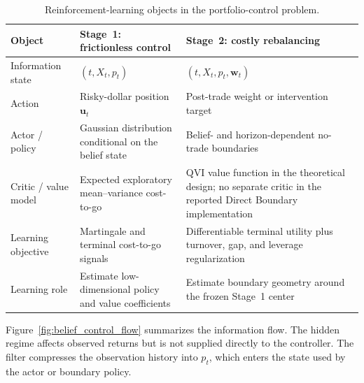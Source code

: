 \documentclass[a4paper,10pt]{article}
\newcommand{\bu}{\bm{u}}
\newcommand{\bw}{\bm{w}}
\begin{document}
\begin{table}[H]
\centering
\small
\caption{Reinforcement-learning objects in the portfolio-control problem.}
\label{tab:rl_correspondence}
\begin{tabular}{>{\raggedright\arraybackslash}p{} >{\raggedright\arraybackslash}p{} >{\raggedright\arraybackslash}p{}}
\toprule
Object & Stage~1: frictionless control & Stage~2: costly rebalancing \\
\midrule
Information state & $(t,X_t,p_t)$ & $(t,X_t,p_t,\bw_t)$ \\
Action & Risky-dollar position $\bu_t$ & Post-trade weight or intervention target \\
Actor / policy & Gaussian distribution conditional on the belief state & Belief- and horizon-dependent no-trade boundaries \\
Critic / value model & Expected exploratory mean--variance cost-to-go & QVI value function in the theoretical design; no separate critic in the reported Direct Boundary implementation \\
Learning objective & Martingale and terminal cost-to-go signals & Differentiable terminal utility plus turnover, gap, and leverage regularization \\
Learning role & Estimate low-dimensional policy and value coefficients & Estimate boundary geometry around the frozen Stage~1 center \\
\bottomrule
\end{tabular}
\end{table}

Figure~\ref{fig:belief_control_flow} summarizes the information flow. The hidden regime affects observed returns but is not supplied directly to the controller. The filter compresses the observation history into $p_t$, which enters the state used by the actor or boundary policy.
\end{document}
